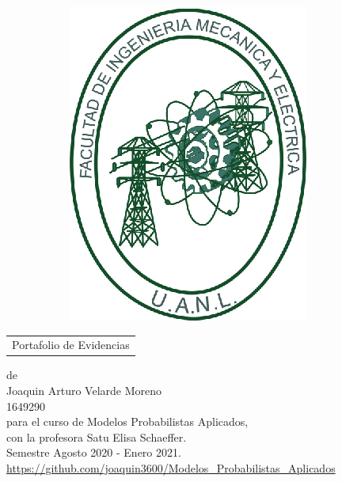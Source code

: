 \begin{scshape}
\begin{center}
\begin{figure}[h!]
\begin{subfigure}{0.2\linewidth}
			\includegraphics[width=\linewidth]{Figuras/fime}
		\end{subfigure}
	\end{figure}
	\vskip16mm
	\begin{tabular}{p{11cm}}
		\centering
		{\large Portafolio de Evidencias}
	\end{tabular}
	\vskip7mm
	{de}\\[7mm]
	{\large Joaquin Arturo Velarde Moreno}\\[3mm]
	{1649290}\\[7 mm]
	{para el curso de Modelos Probabilistas Aplicados,}\\[3mm]
	{con la profesora Satu Elisa Schaeffer.}\\[3mm]
	Semestre Agosto 2020 - Enero 2021. \\ [5 mm]
	\url{https://github.com/joaquin3600/Modelos_Probabilistas_Aplicados}
	\vfill
\end{center}
\end{scshape}